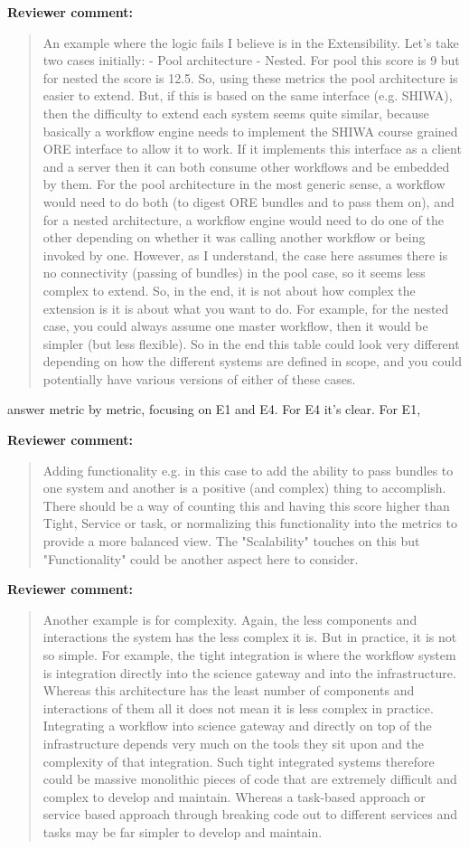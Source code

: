 \documentclass[a4]{article}
\newenvironment{review}%
{\textbf{Reviewer comment:}\begin{quote}}%
{\end{quote}}%
\newcommand{\todo}[1]{\color{red}#1\color{black}}
\begin{document}
\begin{review}
An example where the logic fails I believe is in the Extensibility. Let's take two cases initially:
-	Pool architecture
-	Nested.
For pool this score is 9 but for nested the score is 12.5. So, using these metrics the pool architecture is easier to extend.  But, if this is based on the same interface (e.g. SHIWA), then the difficulty to extend each system seems quite similar, because basically a workflow engine needs to implement the SHIWA course grained ORE interface to allow it to work. If it implements this interface as a client and a server then it can both consume other workflows and be embedded by them. For the pool architecture in the most generic sense, a workflow would need to do both (to digest ORE bundles and to pass them on), and for a nested architecture, a workflow engine would need to do one of the other depending on whether it was calling another workflow or being invoked by one.  However, as I understand, the case here assumes there is no connectivity (passing of bundles) in the pool case, so it seems less complex to extend. So, in the end, it is not about how complex the extension is
it is about what you want to do.  For example, for the nested case, you could always assume one master workflow, then it would be simpler (but less flexible). So in the end this table could look very different depending on how the different systems are defined in scope, and you could potentially have various versions of either of these cases. 
\end{review}

\todo{answer metric by metric, focusing on E1 and E4. For E4 it's clear. For E1, }

\begin{review}
Adding functionality e.g. in this case to add the ability to pass bundles to one system and another is a positive (and complex) thing to accomplish. There should be a way of counting this and having this score higher than Tight, Service or task, or normalizing this functionality into the metrics to provide a more balanced view. The "Scalability" touches on this but "Functionality" could be another aspect here to consider.
\end{review}

\begin{review}
Another example is for complexity.  Again, the less components and interactions the system has the less complex it is. But in practice, it is not so simple. For example, the tight integration is where the workflow system is integration directly into the science gateway and into the infrastructure. Whereas this architecture has the least number of components and interactions of them all it does not mean it is less complex in practice. Integrating a workflow into science gateway and directly on top of the infrastructure depends very much on the tools they sit upon and the complexity of that integration. Such tight integrated systems therefore could be massive monolithic pieces of code that are extremely difficult and complex to develop and maintain.  Whereas a task-based approach or service based approach through breaking code out to different services and tasks may be far simpler to develop and maintain. 
\end{review}
\end{document}

